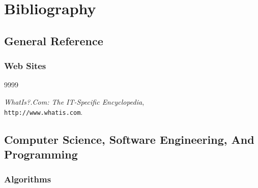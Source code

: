 
%
\chapter*{Bibliography}



\nocite{*}


\section*{General Reference}

\subsection*{Web Sites}

\begin{thecustombibliography}{9999}

\emph{WhatIs?.Com:  The IT-Specific Encyclopedia}, \\
\texttt{http://www.whatis.com}.

\end{thecustombibliography}


\section*{Computer Science, Software Engineering, And Programming}

\subsection*{Algorithms}

